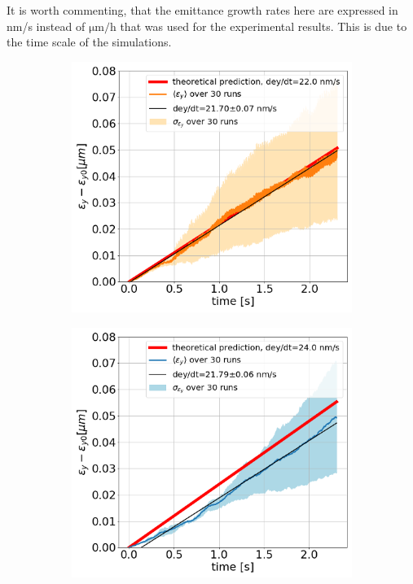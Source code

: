 It is worth commenting, that the emittance growth rates here are expressed in nm/s instead of $\mathrm{\mu m/h}$ that was used for the experimental results. This is due to the time scale of the simulations.
\begin{figure}[htp]
    \centering
    \begin{subfigure}{.45\textwidth}
        \centering
        \includegraphics[width=.95\linewidth]{images/Ch6/pyheadtail_benchmark_amplitude_noise.png}  
    \end{subfigure}
    \begin{subfigure}{.45\textwidth}
        \centering
        \includegraphics[width=.95\linewidth]{images/Ch6/pyheadtail_benchmark_phase_noise.png}

\end{subfigure}
\end{figure}
